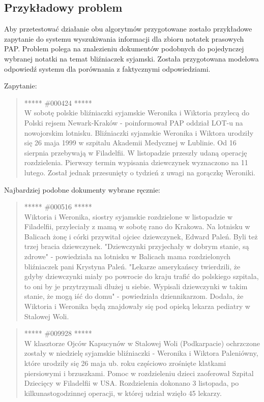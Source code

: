 \documentclass[11pt,a4paper]{article}
\begin{document}
\subsection{Przykładowy problem}
\label{sec:example}

Aby przetestować działanie obu algorytmów przygotowane zostało przykładowe
zapytanie do systemu wyszukiwania informacji dla zbioru notatek prasowych PAP.
Problem polega na znalezieniu dokumentów podobnych do pojedynczej wybranej
notatki na temat bliźniaczek syjamski. Została przygotowana modelowa odpowiedź
systemu dla porównania z faktycznymi odpowiedziami.

Zapytanie:

\begin{quote} ***** \#000424 *****\\ W sobotę polskie bliźniaczki syjamskie
Weronika i Wiktoria przylecą do Polski rejsem Newark-Kraków - poinformował PAP
oddział LOT-u na nowojorskim lotnisku.  Bliźniaczki syjamskie Weronika i
Wiktora urodziły się 26 maja 1999 w szpitalu Akademii Medycznej w Lublinie. Od
16 sierpnia przebywają w Filadelfii. W listopadzie przeszły udaną operację
rozdzielenia. Pierwszy termin wypisania dziewczynek wyznaczono na 11 lutego.
Został jednak przesunięty o tydzień z uwagi na gorączkę Weroniki.  \end{quote}

Najbardziej podobne dokumenty wybrane ręcznie:

\begin{quote} ***** \#000516 *****\\ Wiktoria i Weronika, siostry syjamskie
rozdzielone w listopadzie w Filadelfii, przyleciały z mamą w sobotę rano do
Krakowa. Na lotnisku w Balicach żonę i córki przywitał ojciec dziewczynek,
Edward Paleń. Byli też trzej bracia dziewczynek.  "Dziewczynki przyjechały w
dobrym stanie, są zdrowe" - powiedziała na lotnisku w Balicach mama
rozdzielonych bliźniaczek pani Krystyna Paleń. "Lekarze amerykańscy twierdzili,
że gdyby dziewczynki miały po powrocie do kraju trafić do polskiego szpitala,
to oni by je przytrzymali dłużej u siebie. Wypisali dziewczynki w takim stanie,
że mogą iść do domu" - powiedziała dziennikarzom. Dodała, że Wiktoria i
Weronika będą znajdowały się pod opieką lekarza pediatry w Stalowej Woli.
\end{quote}

\begin{quote} ***** \#009928 *****\\ W klasztorze Ojców Kapucynów w Stalowej Woli
(Podkarpacie) ochrzczone zostały w niedzielę syjamskie bliźniaczki - Weronika i
Wiktora Paleniówny, które urodziły się 26 maja ub. roku częściowo zrośnięte
klatkami piersiowymi i brzuszkami. Pomoc w rozdzieleniu dzieci zaoferował
Szpital Dziecięcy w Filadelfii w USA.  Rozdzielenia dokonano 3 listopada, po
kilkunastogodzinnej operacji, w której udział wzięło 45 lekarzy.  \end{quote}
\end{document}
